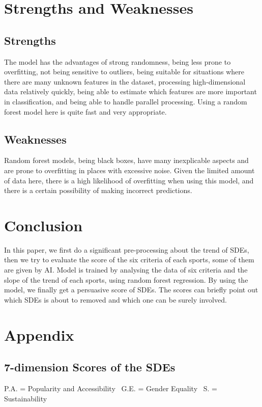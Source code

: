 \documentclass[a4paper]{article}
\begin{document}
\section{Strengths and Weaknesses}

\subsection{Strengths}
The model has the advantages of strong randomness, being less prone to overfitting, not being sensitive to outliers, being suitable for situations where there are many unknown features in the dataset, processing high-dimensional data relatively quickly, being able to estimate which features are more important in classification, and being able to handle parallel processing. Using a random forest model here is quite fast and very appropriate.%
\subsection{Weaknesses}
Random forest models, being black boxes, have many inexplicable aspects and are prone to overfitting in places with excessive noise. Given the limited amount of data here, there is a high likelihood of overfitting when using this model, and there is a certain possibility of making incorrect predictions.%
\section{Conclusion}
In this paper, we first do a significant pre-processing about the trend of SDEs, then we try to evaluate the score of the six criteria of each sports, some of them are given by AI. Model is trained by analysing the data of six criteria and the slope of the trend of each sports, using random forest regression. By using the model, we finally get a persuasive score of SDEs. The scores can briefly point out which SDEs is about to removed and which one can be surely involved.
\section{Appendix}

\subsection{7-dimension Scores of the SDEs}
P.A. = Popularity and Accessibility \ G.E. = Gender Equality \ S. = Sustainability
\end{document}
